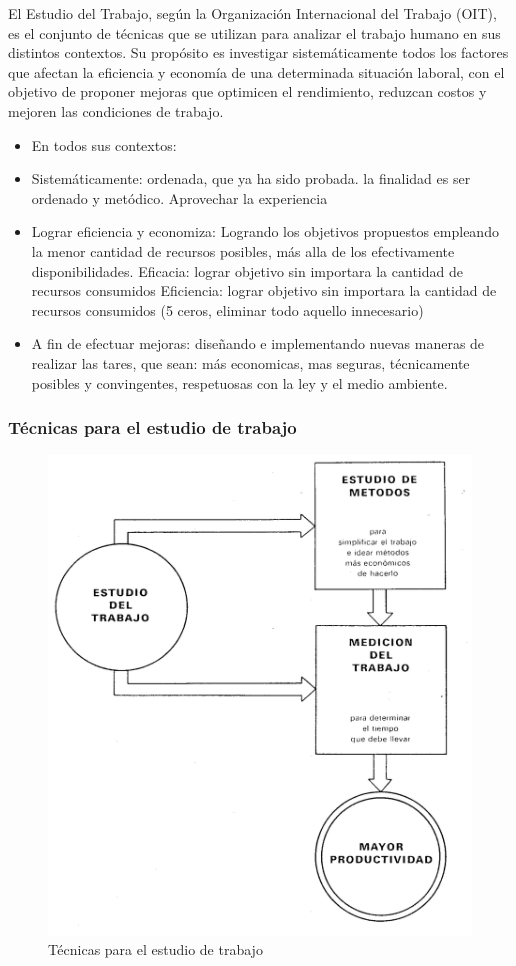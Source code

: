 \documentclass[a4paper,oneside,11pt]{article}
\begin{document}
El Estudio del Trabajo, según la Organización Internacional del Trabajo (OIT), es el conjunto de técnicas que se utilizan para analizar el trabajo humano en sus distintos contextos. Su propósito es investigar sistemáticamente todos los factores que afectan la eficiencia y economía de una determinada situación laboral, con el objetivo de proponer mejoras que optimicen el rendimiento, reduzcan costos y mejoren las condiciones de trabajo.

\begin{itemize}
    \item En todos sus contextos: 
    \item Sistemáticamente: ordenada, que ya ha sido probada. la finalidad es ser ordenado y metódico. Aprovechar la experiencia
    \item Lograr eficiencia y economiza: Logrando los objetivos propuestos empleando la menor cantidad de recursos posibles, más alla de los efectivamente disponibilidades. 
    Eficacia: lograr objetivo sin importara la cantidad de recursos consumidos
    Eficiencia: lograr objetivo sin importara la cantidad de recursos consumidos (5 ceros, eliminar todo aquello innecesario)
    \item A fin de efectuar mejoras: diseñando e implementando nuevas maneras de realizar las tares, que sean: más economicas, mas seguras, técnicamente posibles y convingentes, respetuosas con la ley y el medio ambiente.  
\end{itemize}

\subsubsection{Técnicas para el estudio de trabajo}

\begin{figure} [ht!]
    \centering
    \includegraphics[width=0.5\linewidth]{tecnicas ET.png}
    \caption{Técnicas para el estudio de trabajo}
\end{figure}
\end{document}
